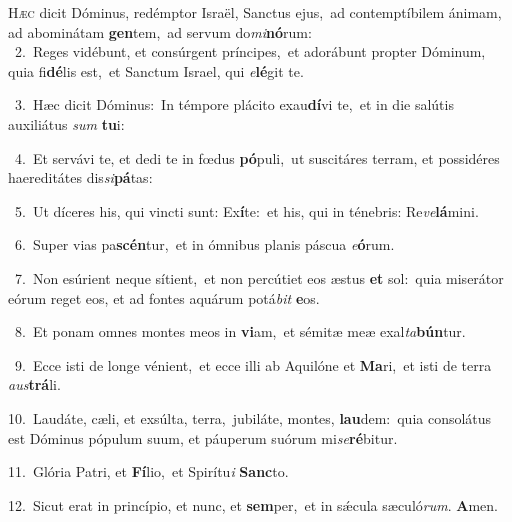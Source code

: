 \lettrine{\initial\textcolor{\initialcolor}{H}}{æc} dicit Dóminus, redémptor Israël, Sanctus ejus,~\dagger ad contemptíbilem ánimam, ad abominátam \textbf{gen}\-tem,~\star ad servum do\-\textit{mi}\-\textbf{nó}rum:\\
{\numbfont\textcolor{\numbcolor}{~2.}}~Reges vidébunt, et consúrgent príncipes,~\dagger et adorábunt propter Dóminum, quia fi\-\textbf{dé}\-lis est,~\star et Sanctum Israel, qui \textit{e}\-\textbf{lé}git te.\par
{\numbfont\textcolor{\numbcolor}{~3.}}~Hæc dicit Dóminus:~\dagger In témpore plácito exau\-\textbf{dí}\-vi te,~\star et in die salútis auxiliátus \textit{sum} \textbf{tu}\-i:\par
{\numbfont\textcolor{\numbcolor}{~4.}}~Et servávi te, et dedi te in fœdus \textbf{pó}\-puli,~\star ut suscitáres terram, et possidéres haereditátes dis\-\textit{si}\-\textbf{pá}tas:\par
{\numbfont\textcolor{\numbcolor}{~5.}}~Ut díceres his, qui vincti sunt: Ex\-\textbf{í}\-te:~\star et his, qui in ténebris: Re\-\textit{ve}\-\textbf{lá}mini.\par
{\numbfont\textcolor{\numbcolor}{~6.}}~Super vias pa\-\textbf{scén}\-tur,~\star et in ómnibus planis páscua \textit{e}\-\textbf{ó}rum.\par
{\numbfont\textcolor{\numbcolor}{~7.}}~Non esúrient neque sítient,~\dagger et non percútiet eos æstus \textbf{et} sol:~\star quia miserátor eórum reget eos, et ad fontes aquárum potá\textit{bit} \textbf{e}\-os.\par
{\numbfont\textcolor{\numbcolor}{~8.}}~Et ponam omnes montes meos in \textbf{vi}\-am,~\star et sémitæ meæ exal\-\textit{ta}\-\textbf{bún}tur.\par
{\numbfont\textcolor{\numbcolor}{~9.}}~Ecce isti de longe vénient,~\dagger et ecce illi ab Aquilóne et \textbf{Ma}\-ri,~\star et isti de terra \textit{aus}\-\textbf{trá}li.\par
{\numbfont\textcolor{\numbcolor}{10.}}~Laudáte, cæli, et exsúlta, terra,~\dagger jubiláte, montes, \textbf{lau}\-dem:~\star quia consolátus est Dóminus pópulum suum, et páuperum suórum mi\-\textit{se}\-\textbf{ré}bitur.\par
{\numbfont\textcolor{\numbcolor}{11.}}~Glória Patri, et \textbf{Fí}\-lio,~\star et Spirítu\textit{i} \textbf{Sanc}\-to.\par
{\numbfont\textcolor{\numbcolor}{12.}}~Sicut erat in princípio, et nunc, et \textbf{sem}\-per,~\star et in sǽcula sæculó\-\textit{rum}\-. \textbf{A}\-men.\par
